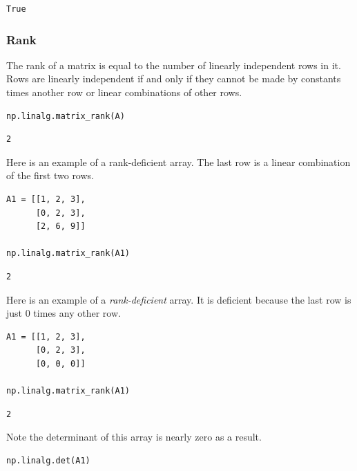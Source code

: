 \documentclass[11pt]{article}
\begin{document}
\begin{verbatim}
True
\end{verbatim}


\subsubsection{Rank}
\label{sec:org6be5dcc}

The rank of a matrix is equal to the number of linearly independent rows in it. Rows are linearly independent if and only if they cannot be made by constants times another row or linear combinations of other rows.

\begin{verbatim}
np.linalg.matrix_rank(A)
\end{verbatim}

\begin{verbatim}
2
\end{verbatim}

Here is an example of a rank-deficient array. The last row is a linear combination of the first two rows.

\begin{verbatim}
A1 = [[1, 2, 3],
      [0, 2, 3],
      [2, 6, 9]]

np.linalg.matrix_rank(A1)
\end{verbatim}

\begin{verbatim}
2
\end{verbatim}

Here is an example of a \emph{rank-deficient} array. It is deficient because the last row is just 0 times any other row.

\begin{verbatim}
A1 = [[1, 2, 3],
      [0, 2, 3],
      [0, 0, 0]]

np.linalg.matrix_rank(A1)
\end{verbatim}

\begin{verbatim}
2
\end{verbatim}

Note the determinant of this array is nearly zero as a result.

\begin{verbatim}
np.linalg.det(A1)
\end{verbatim}
\end{document}
